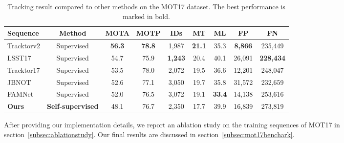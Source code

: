 \begin{table*}
	\small
	\begin{center}
		\begin{tabular}{l c c c c c c c c}
			\hline
			Sequence & Method &\textbf{MOTA} & MOTP & IDs  & MT & ML & FP & FN \\
			\hline
			Tracktorv2\cite{bergmann2019tracking} & Supervised & \textbf{56.3} & \textbf{78.8} & 1,987 & \textbf{21.1} & 35.3 & \textbf{8,866} & 235,449\\
			LSST17\cite{feng2019multi} & Supervised & 54.7 & 75.9 & \textbf{1,243}  & 20.4 & 40.1 & 26,091 & \textbf{228,434}\\
			Tracktor17\cite{bergmann2019tracking} & Supervised & 53.5 & 78.0 & 2,072 & 19.5 & 36.6 & 12,201 & 248,047 \\
			JBNOT\cite{henschel2019multiple} & Supervised & 52.6 & 77.1 & 3,050 & 19.7 & 35.8 & 31,572 & 232,659 \\
			FAMNet\cite{chu2019famnet} & Supervised & 52.0 & 76.5 & 3,072 & 19.1 & \textbf{33.4} & 14,138 & 253,616 \\
			\hline
			\textbf{Ours} & \textbf{Self-supervised} & 48.1 & 76.7 & 2,350 & 17.7 & 39.9 & 16,839 & 273,819\\
			\hline
			
		\end{tabular}
	\caption{Tracking result compared to other methods on the MOT17 dataset. The best performance is marked in bold.}
	\label{tab:mot17compare}
    \vspace*{-10mm}
	\end{center}
\end{table*}
After providing our implementation details, we report an ablation study on the training sequences of MOT17 in section~\ref{subsec:ablationstudy}. 
Our final results are discussed in section~\ref{subsec:mot17benchark}.\\

